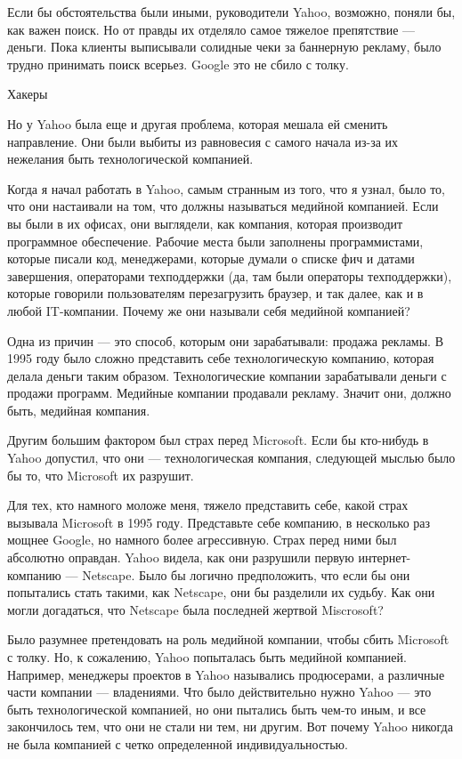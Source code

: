 \documentclass[ebook,12pt,oneside,openany]{memoir}
\begin{document}
Если бы обстоятельства были иными, руководители Yahoo, возможно,
поняли бы, как важен поиск. Но от правды их отделяло самое тяжелое
препятствие — деньги. Пока клиенты выписывали солидные чеки за
баннерную рекламу, было трудно принимать поиск всерьез. Google это не
сбило с толку.

Хакеры


Но у Yahoo была еще и другая проблема, которая мешала ей сменить
направление. Они были выбиты из равновесия с самого начала из-за их
нежелания быть технологической компанией.

Когда я начал работать в Yahoo, самым странным из того, что я узнал,
было то, что они настаивали на том, что должны называться медийной
компанией. Если вы были в их офисах, они выглядели, как компания,
которая производит программное обеспечение. Рабочие места были
заполнены программистами, которые писали код, менеджерами, которые
думали о списке фич и датами завершения, операторами техподдержки (да,
там были операторы техподдержки), которые говорили пользователям
перезагрузить браузер, и так далее, как и в любой IT-компании. Почему
же они называли себя медийной компанией?

Одна из причин — это способ, которым они зарабатывали: продажа
рекламы. В 1995 году было сложно представить себе технологическую
компанию, которая делала деньги таким образом. Технологические
компании зарабатывали деньги с продажи программ. Медийные компании
продавали рекламу. Значит они, должно быть, медийная компания.

Другим большим фактором был страх перед Microsoft. Если бы кто-нибудь
в Yahoo допустил, что они — технологическая компания, следующей мыслью
было бы то, что Microsoft их разрушит.

Для тех, кто намного моложе меня, тяжело представить себе, какой страх
вызывала Microsoft в 1995 году. Представьте себе компанию, в несколько
раз мощнее Google, но намного более агрессивную. Страх перед ними был
абсолютно оправдан. Yahoo видела, как они разрушили первую
интернет-компанию — Netscape. Было бы логично предположить, что если
бы они попытались стать такими, как Netscape, они бы разделили их
судьбу. Как они могли догадаться, что Netscape была последней жертвой
Miscrosoft?

Было разумнее претендовать на роль медийной компании, чтобы сбить
Microsoft с толку. Но, к сожалению, Yahoo попыталась быть медийной
компанией. Например, менеджеры проектов в Yahoo назывались
продюсерами, а различные части компании — владениями. Что было
действительно нужно Yahoo — это быть технологической компанией, но они
пытались быть чем-то иным, и все закончилось тем, что они не стали ни
тем, ни другим. Вот почему Yahoo никогда не была компанией с четко
определенной индивидуальностью.
\end{document}
